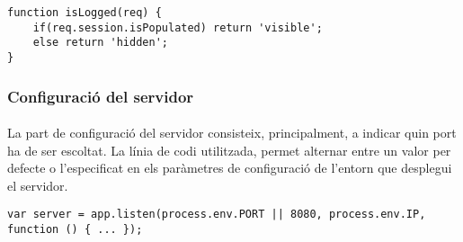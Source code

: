     \begin{lstlisting}[style=rawOwn,caption={Funció per decidir si cal mostrar el botó de desconnexió}]
function isLogged(req) {
    if(req.session.isPopulated) return 'visible';
    else return 'hidden';
}
    \end{lstlisting}


    \subsubsection{Configuració del servidor}

    \paragraph{}
    La part de configuració del servidor consisteix, principalment, a indicar quin port ha de ser escoltat. La línia de codi utilitzada, permet alternar entre un valor per defecte o l'especificat en els paràmetres de configuració de l'entorn que desplegui el servidor.

    \begin{lstlisting}[style=rawOwn,caption={Configuració del servidor}]
var server = app.listen(process.env.PORT || 8080, process.env.IP, function () { ... });
    \end{lstlisting}
